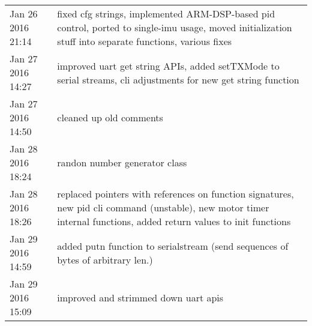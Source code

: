 \begin{longtable}{ l || p{9.5cm}}
	Jan 26 2016 21:14	& fixed cfg strings, implemented ARM-DSP-based pid control, ported to single-imu usage, moved initialization stuff into separate functions, various fixes	\\
	Jan 27 2016 14:27	& improved uart get string APIs, added setTXMode to serial streams, cli adjustments for new get string function	\\
	Jan 27 2016 14:50	& cleaned up old comments	\\
	Jan 28 2016 18:24	& randon number generator class	\\
	Jan 28 2016 18:26	& replaced pointers with references on function signatures, new pid cli command (unstable), new motor timer internal functions, added return values to init functions	\\
	Jan 29 2016 14:59	& added putn function to serialstream (send sequences of bytes of arbitrary len.)	\\
	Jan 29 2016 15:09	& improved and strimmed down uart apis	\\
	\hline  
\end{longtable}
